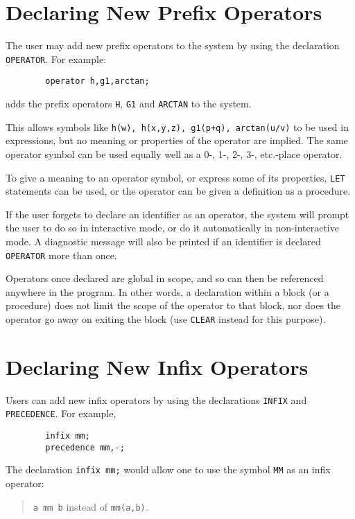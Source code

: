 \section{Declaring New Prefix Operators}

The user may add new prefix operators to the system by
using the declaration {\tt OPERATOR}. For example:
\begin{verbatim}
        operator h,g1,arctan;
\end{verbatim}
adds the prefix operators {\tt H}, {\tt G1} and {\tt ARCTAN} to the system.

This allows symbols like {\tt h(w), h(x,y,z), g1(p+q), arctan(u/v)} to be
used in expressions, but no meaning or properties of the operator are
implied.  The same operator symbol can be used equally well as a 0-, 1-, 2-,
3-, etc.-place operator.

To give a meaning to an operator symbol, or express some of its
properties, {\tt LET} statements can be used, or the operator
can be given a definition as a procedure.

If the user forgets to declare an identifier as an operator, the system
will prompt the user to do so in interactive mode, or do it automatically
in non-interactive mode. A diagnostic message will also be printed if an
identifier is declared {\tt OPERATOR} more than once.

Operators once declared are global in scope, and so can then be referenced
anywhere in the program.  In other words, a declaration within a block (or
a procedure) does not limit the scope of the operator to that block, nor
does the operator go away on exiting the block (use {\tt CLEAR} instead
for this purpose).


\section{Declaring New Infix Operators}

Users can add new infix operators by using the declarations
{\tt INFIX} and {\tt PRECEDENCE}.
For example,
\begin{verbatim}
        infix mm;
        precedence mm,-;
\end{verbatim}
The declaration {\tt infix mm;} would allow one to use the symbol
{\tt MM} as an infix operator:
\begin{quote}
\hspace{0.2in} {\tt a mm b} \hspace{0.3in} instead of \hspace{0.3in}
{\tt mm(a,b)}.
\end{quote}

